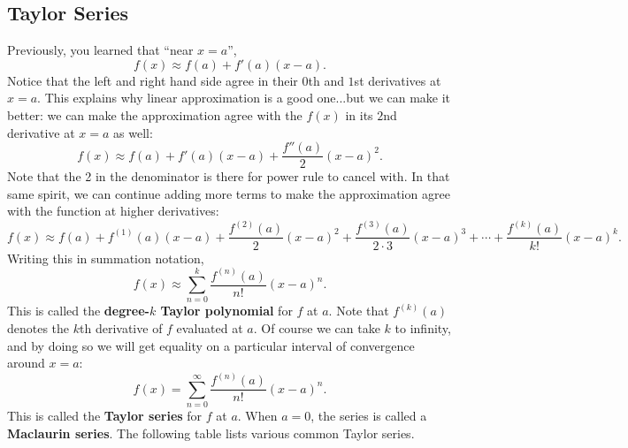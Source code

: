 \subsection{Taylor Series}

Previously, you learned that ``near $x=a$'',
$$f(x)\approx f(a)+f'(a)(x-a).$$
Notice that the left and right hand side agree in their $0$th and $1$st derivatives at $x=a$. This explains why linear approximation is a good one...but we can make it better: we can make the approximation agree with the $f(x)$ in its $2$nd derivative at $x=a$ as well:
$$f(x)\approx f(a)+f'(a)(x-a)+\frac{f''(a)}{2}(x-a)^2.$$
Note that the 2 in the denominator is there for power rule to cancel with. In that same spirit, we can continue adding more terms to make the approximation agree with the function at higher derivatives:
$$f(x) \approx f(a)+f^{(1)}(a)(x-a)+\frac{f^{(2)}(a)}{2}(x-a)^2+\frac{f^{(3)}(a)}{2\cdot 3}(x-a)^3+\cdots+\frac{f^{(k)}(a)}{k!}(x-a)^k.$$
Writing this in summation notation,
$$f(x)\approx \sum_{n=0}^k\frac{f^{(n)}(a)}{n!}(x-a)^n.$$
This is called the \textbf{degree-$k$ Taylor polynomial} for $f$ at $a$. Note that $f^{(k)}(a)$ denotes the $k$th derivative of $f$ evaluated at $a$. Of course we can take $k$ to infinity, and by doing so we will get equality on a particular interval of convergence around $x=a$:
$$f(x)= \sum_{n=0}^\infty\frac{f^{(n)}(a)}{n!}(x-a)^n.$$
This is called the \textbf{Taylor series} for $f$ at $a$. When $a=0$, the series is called a \textbf{Maclaurin series}. The following table lists various common Taylor series.

